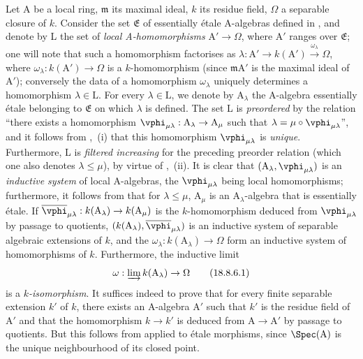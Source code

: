 \begin{env}[18.8.6]
\label{IV.18.8.6}
Let A be a local ring, $\mathfrak{m}$ its maximal ideal, $k$ its residue field, $\Omega$ a separable closure of $k$.
Consider the set $\mathfrak{E}$ of essentially \'{e}tale A-algebras defined in , and denote by L the set of \emph{local A-homomorphisms} $\mathrm{A}'\to\Omega$, where $\mathrm{A}'$ ranges over $\mathfrak{E}$;
one will note that such a homomorphism factorises as $\lambda:\mathrm{A}'\to k(\mathrm{A}')\xrightarrow{\omega_\lambda}\Omega$, where $\omega_\lambda:k(\mathrm{A}')\to\Omega$ is a $k$-homomorphism (since $\mathfrak{m}\mathrm{A}'$ is the maximal ideal of $\mathrm{A}'$);
conversely the data of a homomorphism $\omega_\lambda$ uniquely determines a homomorphism $\lambda\in\mathrm{L}$.
For every $\lambda\in\mathrm{L}$, we denote by $\mathrm{A}_\lambda$ the A-algebra essentially \'{e}tale belonging to $\mathfrak{E}$ on which $\lambda$ is defined.
The set L is \emph{preordered} by the relation ``there exists a homomorphism $\vphi_{\mu\lambda}:\mathrm{A}_\lambda\to\mathrm{A}_\mu$ such that $\lambda=\mu\circ\vphi_{\mu\lambda}$'', and it follows from ,~(i) that this homomorphism $\vphi_{\mu\lambda}$ is \emph{unique}.
Furthermore, L is \emph{filtered increasing} for the preceding preorder relation (which one also denotes $\lambda\leq\mu$), by virtue
of ,~(ii).
It is clear that $(\mathrm{A}_\lambda,\vphi_{\mu\lambda})$ is an \emph{inductive system} of local A-algebras, the $\vphi_{\mu\lambda}$ being local homomorphisms;
furthermore, it follows from  that for $\lambda\leq\mu$, $\mathrm{A}_\mu$ is an $\mathrm{A}_\lambda$-algebra that is essentially \'{e}tale.
If $\overline{\vphi}_{\mu\lambda}:k(\mathrm{A}_\lambda)\to k(\mathrm{A}_\mu)$ is the $k$-homomorphism deduced from $\vphi_{\mu\lambda}$ by passage to quotients, $(k(\mathrm{A}_\lambda),\overline{\vphi}_{\mu\lambda})$ is an inductive system of separable algebraic extensions of $k$, and the $\omega_\lambda:k(\mathrm{A}_\lambda)\to\Omega$ form an inductive system of homomorphisms of $k$.
Furthermore, the inductive limit
\begin{equation}
  \omega:\varinjlim k(\mathrm{A}_\lambda)\to\Omega
  \label{IV.18.8.6.1}
\tag{18.8.6.1}
\end{equation}
is a $k$\emph{-isomorphism}.
It suffices indeed to prove that for every finite separable extension $k'$ of $k$, there exists an A-algebra $\mathrm{A}'$ such that $k'$ is the residue field of $\mathrm{A}'$ and that the homomorphism $k\to k'$ is deduced from $\mathrm{A}\to\mathrm{A}'$ by passage to quotients.
But this follows from  applied to \'{e}tale morphisms, since $\Spec(\mathrm{A})$ is the unique neighbourhood of its closed point.


\end{env}

